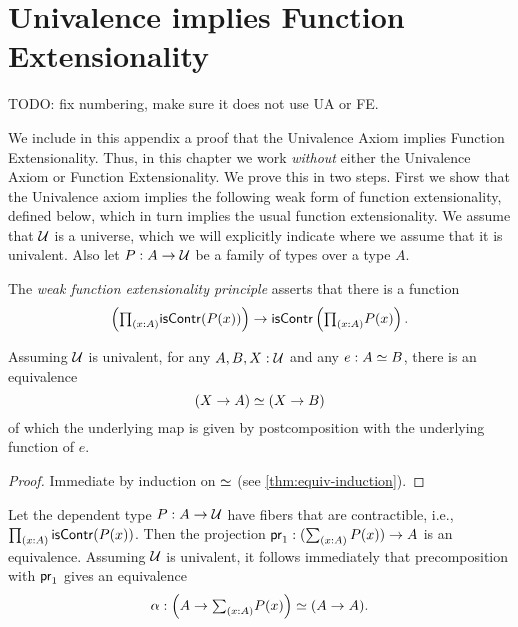 \chapter{Univalence implies Function Extensionality}


TODO: fix numbering, make sure it does not use UA or FE.

We include in this appendix a proof that the Univalence Axiom implies Function
Extensionality. Thus, in this chapter we work \emph{without} either the Univalence Axiom
or Function Extensionality. We prove this in two steps. First we show that the Univalence
axiom implies the following weak form of function extensionality, defined below, which in turn implies the usual function extensionality.
We assume that $\mathcal{U}$ is a universe, which we will explicitly indicate where we assume that it is univalent. Also let $P : A \to \mathcal{U}$ be a family of types over a type $A$. %
\begin{defn}
The \emph{weak function extensionality principle} asserts that there is a function
\begin{equation*}
\left(\tprd{x:A}\iscontr(P(x))\right)
  \to\iscontr\left(\tprd{x:A}P(x)\right).
\end{equation*}
\end{defn}

\begin{lem} \label{UA-eqv-hom-eqv}
Assuming $\mathcal{U}$ is univalent, for any $A,B,X:\mathcal{U}$ and any $e:A \simeq B$, there is an equivalence
\begin{equation*}
(X\to A) \simeq (X\to B)
\end{equation*}
of which the underlying map is given by postcomposition with the underlying function of $e$.
\end{lem}

\begin{proof}
Immediate by induction on $ \simeq $ (see \autoref{thm:equiv-induction}).
\end{proof}

\begin{cor}
Let the dependent type $P:A\to\mathcal{U}$ have fibers that are contractible, i.e., $\prd{x:A}\iscontr(P(x))$.
Then the projection $\proj{1}:(\sm{x:A}P(x))\to A$ is an equivalence. Assuming $\mathcal{U}$ is univalent, it follows immediately that precomposition with $\mathsf{pr}_{1}$ gives an equivalence
\begin{equation*}
\alpha : \eqv{\left(A\to\tsm{x:A}P(x)\right)}{(A\to A)}.
\end{equation*}
\end{cor}

